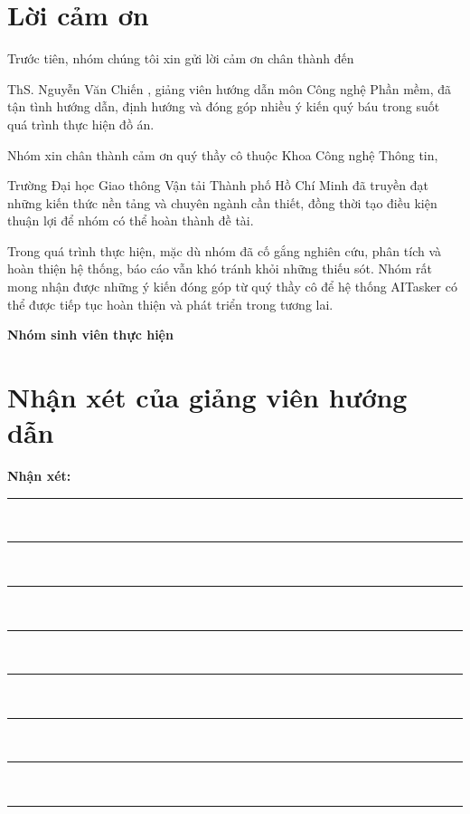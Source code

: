 \documentclass[14pt,a4paper,oneside]{extreport}
\newcommand{\projectname}{AITasker}
\newcommand{\universityname}{
    Trường Đại học Giao thông Vận tải Thành phố Hồ Chí Minh
}
\newcommand{\instructorname}{
    ThS. Nguyễn Văn Chiến
}
\begin{document}
\chapter*{Lời cảm ơn}

Trước tiên, nhóm chúng tôi xin gửi lời cảm ơn chân thành đến
\instructorname, giảng viên hướng dẫn môn Công nghệ Phần mềm, đã tận tình
hướng dẫn, định hướng và đóng góp nhiều ý kiến quý báu trong suốt quá trình
thực hiện đồ án.

Nhóm xin chân thành cảm ơn quý thầy cô thuộc Khoa Công nghệ Thông tin,
\universityname{} đã truyền đạt những kiến thức nền tảng và chuyên ngành cần
thiết, đồng thời tạo điều kiện thuận lợi để nhóm có thể hoàn thành đề tài.

Trong quá trình thực hiện, mặc dù nhóm đã cố gắng nghiên cứu, phân tích và
hoàn thiện hệ thống, báo cáo vẫn khó tránh khỏi những thiếu sót. Nhóm rất mong
nhận được những ý kiến đóng góp từ quý thầy cô để hệ thống \projectname{} có
thể được tiếp tục hoàn thiện và phát triển trong tương lai.

\vspace{1cm}

\begin{flushright}
    \textbf{Nhóm sinh viên thực hiện}
\end{flushright}

\clearpage


\chapter*{Nhận xét của giảng viên hướng dẫn}

\vspace{0.5cm}

\noindent
\textbf{Nhận xét:}

\vspace{0.5cm}

\noindent
\rule{\textwidth}{0.4pt}\\[0.8cm]
\rule{\textwidth}{0.4pt}\\[0.8cm]
\rule{\textwidth}{0.4pt}\\[0.8cm]
\rule{\textwidth}{0.4pt}\\[0.8cm]
\rule{\textwidth}{0.4pt}\\[0.8cm]
\rule{\textwidth}{0.4pt}\\[0.8cm]
\rule{\textwidth}{0.4pt}\\[0.8cm]
\rule{\textwidth}{0.4pt}
\end{document}
